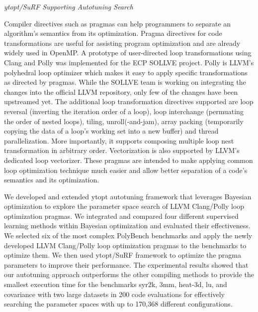 \vspace*{.1in}
\noindent
\textit{ytopt/SuRF Supporting Autotuning Search}

Compiler directives such as pragmas can help programmers to separate an algorithm's semantics from its optimization. Pragma directives for code transformations are useful for assisting program optimization and are already widely used in OpenMP. A prototype of user-directed loop transformations using Clang and Polly was implemented for the ECP SOLLVE project.
Polly is LLVM's polyhedral loop optimizer which makes it easy to apply specific transformations as directed by pragmas.
While the SOLLVE team is working on integrating the changes into the official LLVM repository, only few of the changes have been upstreamed yet.
The additional loop transformation directives supported are loop reversal (inverting the iteration order of a loop), loop interchange (permuating the order of nested loops), tiling, unroll(-and-jam), array packing (temporarily copying the data of a loop's working set into a new buffer) and thread parallelization. 
More importantly, it supports composing multiple loop nest transformation in arbitrary order. Vectorization is also supported by LLVM's dedicated loop vectorizer.
These pragmas are intended to make applying common loop optimization technique much easier and allow better separation of a code's semantics and its optimization.

We developed and extended ytopt autotuning framework that leverages Bayesian optimization to explore the parameter space search of LLVM Clang/Polly loop optimization pragmas. We integrated and compared four different supervised learning methods within Bayesian optimization and evaluated their effectiveness. We selected six of the most complex PolyBench benchmarks and apply the newly developed LLVM Clang/Polly loop optimization pragmas to the benchmarks to optimize them. We then used ytopt/SuRF framework to optimize the pragma parameters to improve their performance. The experimental results showed that our autotuning approach outperforms the other compiling methods to provide the smallest execution time for the benchmarks syr2k, 3mm, heat-3d, lu, and covariance with two large datasets in 200 code evaluations for effectively searching the parameter spaces with up to 170,368 different configurations. 

